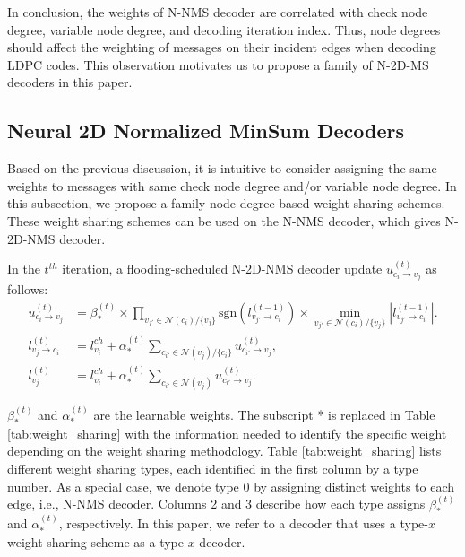 \documentclass [PhD] {uclathes}
\begin{document}
In conclusion, the weights of N-NMS decoder are correlated with check node degree, variable node degree, and decoding iteration index. Thus, node degrees should affect the weighting of messages on their incident edges when decoding LDPC codes. This observation motivates us to propose a family of N-2D-MS decoders in this paper. 
\begin{center}
    
\end{center}
\subsection{Neural 2D Normalized MinSum Decoders}
Based on the previous discussion, it is intuitive to consider assigning the same weights to messages with same check node degree and/or variable node degree. 
In this subsection, we propose a family node-degree-based weight sharing schemes.
These weight sharing schemes can be used on the  N-NMS decoder, which gives N-2D-NMS decoder. 

In the $t^{th}$ iteration, a flooding-scheduled N-2D-NMS decoder update $u^{(t)}_{c_i\rightarrow v_j}$ as follows:
\begingroup
\allowbreak
\begin{align}
     u^{(t)}_{c_i\rightarrow v_j} &= \beta^{(t)}_{*} \times  \prod_{v_{j'}\in \mathcal{N}(c_i)/\{v_j\}} \text{sgn}\left(l^{(t-1)}_{v_{j'}\rightarrow c_{i}}\right)  \times  \min_{v_{j'}\in \mathcal{N}(c_i)/\{v_j\}} \left|l^{(t-1)}_{v_{j'}\rightarrow c_{i}}\right|.\\
      l^{(t)}_{v_j\rightarrow c_i} &=  l^{ch}_{v_i} + \alpha^{(t)}_{*}  \sum_{c_{i'}\in \mathcal{N}(v_j)/\{c_i\}} u^{(t)}_{c_{i'}\rightarrow v_j},\\
    l^{(t)}_{v_j} &=  l^{ch}_{v_i} + \alpha^{(t)}_{*}  \sum_{c_{i'}\in \mathcal{N}(v_j)} u^{(t)}_{c_{i'}\rightarrow v_j}.
\end{align}
\endgroup




$\beta^{(t)}_{*}$ and $\alpha^{(t)}_{*}$ are the learnable weights. The subscript * is replaced in Table \ref{tab:weight_sharing} with the information needed to identify the specific weight depending on the weight sharing methodology. 
Table \ref{tab:weight_sharing} lists different weight sharing types, each identified in the first column by a type number. As a special case, we denote type 0 by assigning distinct weights to each edge, i.e., N-NMS decoder. Columns 2 and 3 describe how each type assigns $\beta^{(t)}_{*}$ and $\alpha^{(t)}_{*}$, respectively. In this paper, we refer to a decoder that uses a type-$x$ weight sharing scheme as a type-$x$ decoder. 
\end{document}
